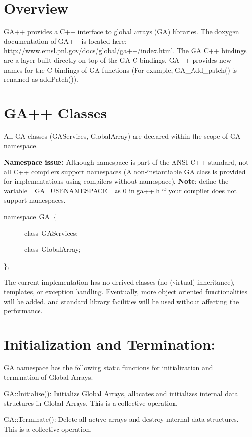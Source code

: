 
\section{Overview }

GA++ provides a C++ interface to global arrays (GA) libraries. The
doxygen documentation of GA++ is located here: \href{http://www.emsl.pnl.gov/docs/global/ga++/index.html}{http://www.emsl.pnl.gov/docs/global/ga++/index.html}.
The GA C++ bindings are a layer built directly on top of the GA C
bindings. GA++ provides new names for the C bindings of GA functions
(For example, GA\_Add\_patch() is renamed as addPatch()). 


\section{GA++ Classes }

All GA classes (GAServices, GlobalArray) are declared within the scope
of GA namespace.

\textbf{\textcolor{black}{Namespace issue: }}Although namespace is
part of the ANSI C++ standard, not all C++ compilers support namespaces
(A non-instantiable GA class is provided for implementations using
compilers without namespace). \textbf{Note}: define the variable \_GA\_USENAMESPACE\_
as 0 in ga++.h if your compiler does not support namespaces. 
\begin{lyxcode}
namespace~GA~\{

~~~~~~class~GAServices;~

~~~~~~class~GlobalArray;~

\};
\end{lyxcode}
The current implementation has no derived classes (no (virtual) inheritance),
templates, or exception handling. Eventually, more object oriented
functionalities will be added, and standard library facilities will
be used without affecting the performance. 


\section{Initialization and Termination: }

GA namespace has the following static functions for initialization
and termination of Global Arrays.

GA::Initialize(): Initialize Global Arrays, allocates and initializes
internal data structures in Global Arrays. This is a collective operation.

GA::Terminate(): Delete all active arrays and destroy internal data
structures. This is a collective operation.

